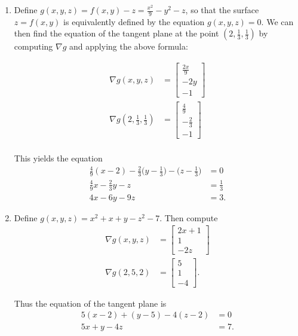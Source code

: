  \begin{enumerate}
  \item Define $g(x,y,z) = f(x,y) - z = \frac{x^2}{9} - y^2 - z$, so that the
   surface  $z = f(x,y)$ is equivalently defined by the equation
   $g(x,y,z) = 0$.
   We can then find the equation of the tangent plane at the point
   $(2, \frac{1}{3}, \frac{1}{3})$ by computing $\nabla g$ and applying the
   above formula:

   \begin{align*}
    \nabla g(x,y,z) &=
     \begin{bmatrix} \frac{2x}{9} \\ -2y \\ -1 \end{bmatrix} \\
    \nabla g(2,\frac{1}{3},\frac{1}{3}) &=
     \begin{bmatrix} \frac{4}{9} \\ -\frac{2}{3} \\ -1 \end{bmatrix} \\
   \end{align*}

   This yields the equation
   \begin{align*}
    \frac{4}{9}(x - 2) - \frac{2}{3}\Big(y - \frac{1}{3}\Big) - \Big(z - \frac{1}{3}\Big) &= 0 \\
    \frac{4}{9}x - \frac{2}{3}y - z &= \frac{1}{3} \\
    4x - 6y - 9z &= 3.
   \end{align*}

  \item Define $g(x,y,z) = x^2 + x + y - z^2 - 7$.  Then compute
   \begin{align*}
    \nabla g(x,y,z) &= \begin{bmatrix} 2x + 1 \\ 1 \\ -2z \end{bmatrix} \\
    \nabla g(2,5,2) &= \begin{bmatrix} 5 \\ 1 \\ -4 \end{bmatrix}.
   \end{align*}

   Thus the equation of the tangent plane is
   \begin{align*}
    5(x - 2) + (y - 5) - 4(z - 2) &= 0 \\
    5x + y - 4z &= 7.
   \end{align*}
 \end{enumerate}

